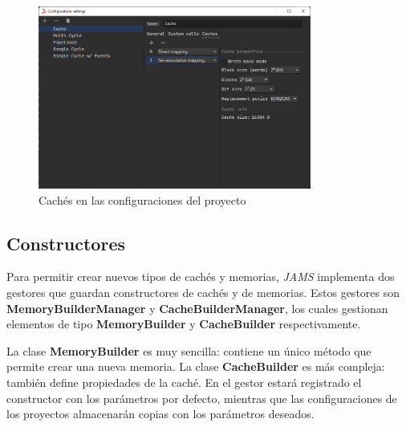 \begin{figure}[H]
    \centering
    \includegraphics[width=0.8\textwidth]{images/mips/jams-caches}
    \caption{Cachés en las configuraciones del proyecto}
    \label{fig:jams-caches}
\end{figure}

\subsection{Constructores}\label{subsec:constructores}

Para permitir crear nuevos tipos de cachés y memorias,
\textit{JAMS} implementa dos gestores que guardan constructores de cachés
y de memorias.
Estos gestores son \textbf{MemoryBuilderManager} y \textbf{CacheBuilderManager},
los cuales gestionan elementos de tipo
\textbf{MemoryBuilder} y \textbf{CacheBuilder} respectivamente.

\noindent La clase \textbf{MemoryBuilder} es muy sencilla:
contiene un único método que permite crear una nueva memoria.
La clase \textbf{CacheBuilder} es más compleja:
también define propiedades de la caché.
En el gestor estará registrado el constructor con los parámetros por defecto,
mientras que las configuraciones de los proyectos almacenarán copias con los
parámetros deseados.